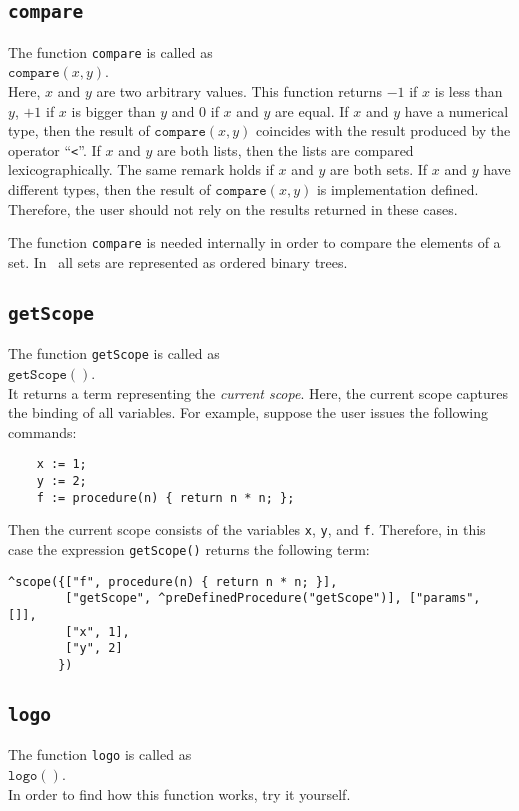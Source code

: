 \subsection{\texttt{compare}}
The function \texttt{compare}  is called as
\\[0.2cm]
\hspace*{1.3cm}
$\mathtt{compare}(x, y)$.
\\[0.2cm]
Here, $x$ and $y$ are two arbitrary values.  This function returns $-1$ if $x$ is less
than $y$, $+1$ if $x$ is bigger than $y$ and $0$ if $x$ and $y$ are equal.
If $x$ and $y$ have a numerical type,  then the result of $\mathtt{compare}(x,y)$
coincides with the result produced by the operator ``\texttt{<}''.
If $x$ and $y$ are both lists, then the lists are compared lexicographically.
The same remark holds if $x$ and $y$ are both sets.   If $x$ and $y$ have different types,
then the result of $\mathtt{compare}(x, y)$ is implementation defined.  Therefore, the
user should not rely on the results returned in these cases.

The function \texttt{compare} is needed internally in order to compare the elements of a
set.  In \setlx\ all sets are represented as ordered binary trees.

\subsection{\texttt{getScope}}
The function \texttt{getScope}  is called as
\\[0.2cm]
\hspace*{1.3cm}
$\mathtt{getScope}()$.
\\[0.2cm]
It returns a term representing the  \emph{current scope}.  Here, the current scope
captures the binding of all variables.  For example, suppose the user issues the following
commands: 
\begin{verbatim}
    x := 1;
    y := 2;
    f := procedure(n) { return n * n; };
\end{verbatim}
Then the current scope consists of the variables \texttt{x}, \texttt{y}, and \texttt{f}.
Therefore, in this case the expression \texttt{getScope()} returns the following term:
\begin{verbatim}
^scope({["f", procedure(n) { return n * n; }], 
        ["getScope", ^preDefinedProcedure("getScope")], ["params", []], 
        ["x", 1], 
        ["y", 2]
       })
\end{verbatim}
 
\subsection{\texttt{logo}}
The function \texttt{logo}  is called as
\\[0.2cm]
\hspace*{1.3cm}
$\mathtt{logo}()$.
\\[0.2cm]
In order to find how this function works, try it yourself.

